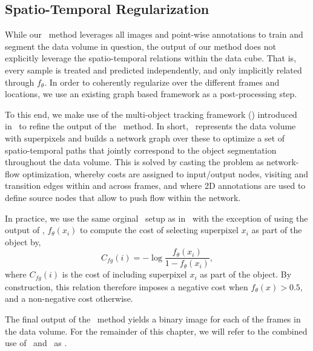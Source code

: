\subsection{Spatio-Temporal Regularization}
\label{sec:tracking}

While our \SSnnPU~method leverages all images and point-wise annotations to train and segment the data volume in question, the output of our method does not explicitly leverage the spatio-temporal relations within the data cube. That is, every sample is treated and predicted independently, and only implicitly related through $f_\theta$. In order to coherently regularize over the different frames and locations, we use an existing graph based framework as a post-processing step.

To this end, we make use of the multi-object tracking framework (\KSPTrack) introduced in~\cite{lejeune18} to refine the output of the \SSnnPU~method. In short, \KSPTrack~represents the data volume with superpixels and builds a network graph over these to optimize a set of spatio-temporal paths that jointly correspond to the object segmentation throughout the data volume. This is solved by casting the problem as network-flow optimization, whereby costs are assigned to input/output nodes, visiting and transition edges within and across frames, and where 2D annotations are used to define source nodes that allow to push flow within the network.

In practice, we use the same orginal \KSPTrack~setup as in~\cite{lejeune18} with the exception of using the output of \SSnnPU, $f_{\theta}(x_i)$ to compute the cost of selecting superpixel $x_i$ as part of the object by,
\begin{equation}
  \label{eq:cost_fg}
  C_{fg}(i) = -\log \frac{f_\theta(x_i)}{1-f_\theta(x_i)},
\end{equation}
\noindent
where $C_{fg}(i)$ is the cost of including superpixel $x_i$ as part of the object. By construction, this relation therefore imposes a negative cost when $f_{\theta}(x) > 0.5$, and a non-negative cost otherwise.

The final output of the \KSPTrack~method yields a binary image for each of the frames in the data volume. For the remainder of this chapter, we will refer to the combined use of \SSnnPU~and \KSPTrack~as \SSnnPUKSP.

